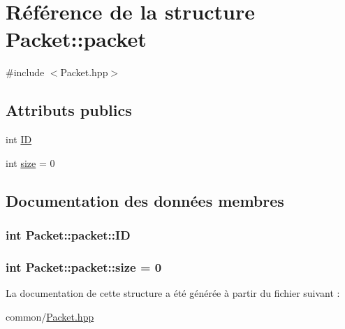 \hypertarget{structPacket_1_1packet}{}\section{Référence de la structure Packet\+:\+:packet}
\label{structPacket_1_1packet}


{\ttfamily \#include $<$Packet.\+hpp$>$}

\subsection*{Attributs publics}
\begin{DoxyCompactItemize}
\item 
int \hyperlink{structPacket_1_1packet_a6a964ed4653dedd272f901fa77fc98b0}{I\+D}
\item 
int \hyperlink{structPacket_1_1packet_a4acd14895382f87f51cb4c0465de0397}{size} = 0
\end{DoxyCompactItemize}


\subsection{Documentation des données membres}
\hypertarget{structPacket_1_1packet_a6a964ed4653dedd272f901fa77fc98b0}{}
\subsubsection[{I\+D}]{\setlength{\rightskip}{0pt plus 5cm}int Packet\+::packet\+::\+I\+D}\label{structPacket_1_1packet_a6a964ed4653dedd272f901fa77fc98b0}
\hypertarget{structPacket_1_1packet_a4acd14895382f87f51cb4c0465de0397}{}
\subsubsection[{size}]{\setlength{\rightskip}{0pt plus 5cm}int Packet\+::packet\+::size = 0}\label{structPacket_1_1packet_a4acd14895382f87f51cb4c0465de0397}


La documentation de cette structure a été générée à partir du fichier suivant \+:\begin{DoxyCompactItemize}
\item 
common/\hyperlink{Packet_8hpp}{Packet.\+hpp}\end{DoxyCompactItemize}
